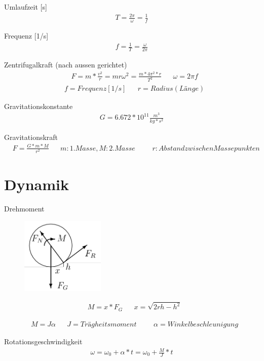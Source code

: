 \documentclass[17pt]{extarticle}
\begin{document}
	Umlaufzeit [s]
	\begin{align}
		T = \frac{2 \pi}{\omega}  = \frac{1}{f}
	\end{align}
	
	Frequenz [1/s]
	\begin{align}
		f = \frac{1}{T} = \frac{\omega}{2 \pi}
	\end{align}
	
	Zentrifugalkraft (nach aussen gerichtet)
	\begin{align}
		&F = m * \frac{v^2}{r} = m r \omega^2 = \frac{m * 4 \pi^2 * r}{T^2}
		&&\omega = 2 \pi f
	\end{align}
	\begin{align}
		& f = Frequenz [1/s]
		&& r = Radius (Länge)
	\end{align}
	
	Gravitationskonstante
	\begin{align}
		G = 6.672 * 10^{11} \frac{m^3}{kg*s^2}
	\end{align}
	
	Gravitationskraft
	\begin{align}
		&F = \frac{G * m * M}{r^2}
		&&m: 1. Masse, M: 2. Masse
		&&&r: Abstand zwischen Massepunkten
	\end{align}
	
\section{Dynamik}
	Drehmoment
	
	\begin{figure}[h!]
		\centering
		\includegraphics[width=4cm]{img/Drehmoment.png}
	\end{figure}


	\begin{align}
		&M = x*F_{G}
		&&x = \sqrt{2rh - h^2}
	\end{align}
	
	\begin{align}
		&M = J \alpha
		&&J = Trägheitsmoment
		&&&\alpha = Winkelbeschleunigung
	\end{align}
	
	Rotationsgeschwindigkeit
	\begin{align}
		\omega = \omega_{0} + \alpha * t = \omega_{0} + \frac{M}{J} * t
	\end{align}
	
\end{document}
